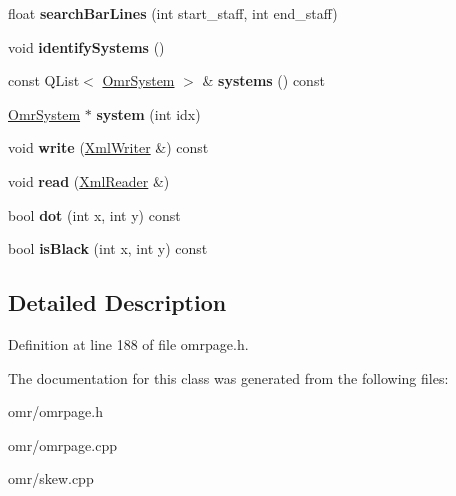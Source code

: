 \begin{DoxyCompactItemize}
float {\bfseries search\+Bar\+Lines} (int start\+\_\+staff, int end\+\_\+staff)
\item 
\mbox{\label{class_ms_1_1_omr_page_afa034d3a11eff4f9a0008e9a8401ba0b}} 
void {\bfseries identify\+Systems} ()
\item 
\mbox{\label{class_ms_1_1_omr_page_ad9f90fe6ecb4fb5d611655a1177bd848}} 
const Q\+List$<$ \hyperlink{class_ms_1_1_omr_system}{Omr\+System} $>$ \& {\bfseries systems} () const
\item 
\mbox{\label{class_ms_1_1_omr_page_a898e578ce21287186a2fb754094a6aa1}} 
\hyperlink{class_ms_1_1_omr_system}{Omr\+System} $\ast$ {\bfseries system} (int idx)
\item 
\mbox{\label{class_ms_1_1_omr_page_af9fadf110155aae01d010748d0274374}} 
void {\bfseries write} (\hyperlink{class_ms_1_1_xml_writer}{Xml\+Writer} \&) const
\item 
\mbox{\label{class_ms_1_1_omr_page_a9fbcf0cc1263adff01416b23a24839d2}} 
void {\bfseries read} (\hyperlink{class_ms_1_1_xml_reader}{Xml\+Reader} \&)
\item 
\mbox{\label{class_ms_1_1_omr_page_a4dea8bcbbe45e1950d892cead07efd25}} 
bool {\bfseries dot} (int x, int y) const
\item 
\mbox{\label{class_ms_1_1_omr_page_a21977543068e3d53c9551488ec6b9b96}} 
bool {\bfseries is\+Black} (int x, int y) const
\end{DoxyCompactItemize}


\subsection{Detailed Description}


Definition at line 188 of file omrpage.\+h.



The documentation for this class was generated from the following files\+:\begin{DoxyCompactItemize}
\item 
omr/omrpage.\+h\item 
omr/omrpage.\+cpp\item 
omr/skew.\+cpp\end{DoxyCompactItemize}
